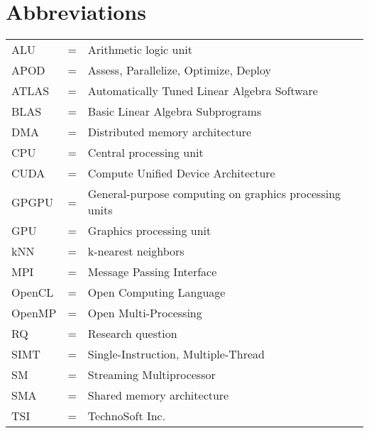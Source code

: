 
\section*{{\Huge Abbreviations}}
\vspace{1 cm}

\noindent
\begin{center}
\begin{tabular}{ l c l }
   ALU    & =                      & Arithmetic logic unit \\
   APOD   & =                      & Assess, Parallelize, Optimize, Deploy\\
   ATLAS  & =                      & Automatically Tuned Linear Algebra Software\\
   BLAS   & =                      & Basic Linear Algebra Subprograms\\
   DMA    & =                      & Distributed memory architecture \\
   CPU    & =                      & Central processing unit \\
   CUDA   & =                      & Compute Unified Device Architecture \\
   GPGPU  & =                      & General-purpose computing on graphics processing units \\
   GPU    & =                      & Graphics processing unit \\
   kNN    & =                      & k-nearest neighbors\\
   MPI    & =                      & Message Passing Interface \\
   OpenCL & =                      & Open Computing Language \\
   OpenMP & =                      & Open Multi-Processing \\
   RQ     & =                      & Research question \\
   SIMT   & =                      & Single-Instruction, Multiple-Thread \\
   SM     & =                      & Streaming Multiprocessor \\
   SMA    & =                      & Shared memory architecture \\
   TSI    & =                      & TechnoSoft Inc. \\

\end{tabular}
\end{center}

\cleardoublepage

\pagestyle{fancy}
\fancyhf{}
\renewcommand{\chaptermark}[1]{\markboth{\chaptername\ \thechapter.\ #1}{}}
\renewcommand{\sectionmark}[1]{\markright{\thesection\ #1}}
\renewcommand{\headrulewidth}{0.1ex}
\renewcommand{\footrulewidth}{0.1ex}
\fancyfoot[LE,RO]{\thepage}
\fancyhead[LE]{\leftmark}
\fancyhead[RO]{\rightmark}
\fancypagestyle{plain}{\fancyhf{}\fancyfoot[LE,RO]{\thepage}\renewcommand{\headrulewidth}{0ex}}

\setcounter{page}{1}
